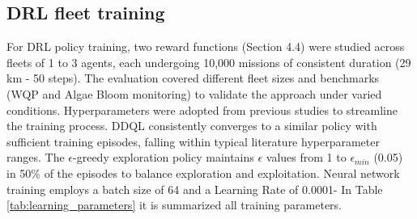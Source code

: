 \documentclass[journal]{IEEEtran}
\begin{document}
\subsection{DRL fleet training}



For DRL policy training, two reward functions (Section 4.4) were studied across fleets of 1 to 3 agents, each undergoing 10,000 missions of consistent duration (29 km - 50 steps). The evaluation covered different fleet sizes and benchmarks (WQP and Algae Bloom monitoring) to validate the approach under varied conditions. Hyperparameters were adopted from previous studies \cite{yanes_deep_2020} to streamline the training process. DDQL consistently converges to a similar policy with sufficient training episodes, falling within typical literature hyperparameter ranges. The $\epsilon$-greedy exploration policy maintains $\epsilon$ values from 1 to $\epsilon_{min}$ (0.05) in 50\% of the episodes to balance exploration and exploitation. Neural network training employs a batch size of 64 and a Learning Rate of 0.0001- In Table \ref{tab:learning_parameters} it is summarized all training parameters.
\end{document}
